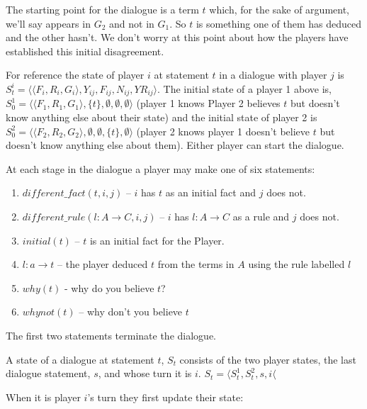 \documentclass{blue-book}
\newcommand{\drule}[3]{\ensuremath{#1:#2 \rightarrow #3}}
\begin{document}
The starting point for the dialogue is a term $t$ which, for the sake of argument, we'll say appears in $G_2$ and not in $G_1$.  So $t$ is something one of them has deduced and the other hasn't.  We don't worry at this point about how the players have established this initial disagreement.

For reference the state of player $i$ at statement $t$ in a dialogue with player $j$ is $S^i_t = \langle \langle F_i, R_i, G_i \rangle, Y_{ij}, F_{ij}, N_{ij}, YR_{ij} \rangle$.  The initial state of a player 1 above is, $S^1_0 = \langle \langle F_1, R_1, G_1 \rangle, \{t\}, \emptyset, \emptyset, \emptyset \rangle$ (player 1 knows Player 2 believes $t$ but doesn't know anything else about their state) and the initial state of player 2 is $S^2_0 = \langle \langle F_2, R_2, G_2 \rangle, \emptyset, \emptyset, \{t\}, \emptyset \rangle$ (player 2 knows player 1 doesn't believe $t$ but doesn't know anything else about them).  Either player can start the dialogue.


At each stage in the dialogue a player may make one of six statements:  
\begin{enumerate}
\item $\mathit{different\_fact(t, i, j)}$ -- $i$ has $t$ as an initial fact and $j$ does not.
\item $\mathit{different\_rule(\drule{l}{A}{C}, i, j)}$ -- $i$ has $\drule{l}{A}{C}$ as a rule and $j$ does not.
\item $initial(t)$ -- $t$ is an initial fact for the Player.
\item $\drule{l}{a}{t}$ -- the player deduced $t$ from the terms in $A$ using the rule labelled $l$
\item $why(t)$ - why do you believe $t$?
\item $whynot(t)$ -- why don't you believe $t$
\end{enumerate}
The first two statements terminate the dialogue.

A state of a dialogue at statement $t$, $S_t$ consists of the two player states, the last dialogue statement, $s$, and whose turn it is $i$.  $S_t = \langle S^1_t, S^2_t, s, i \langle$

When it is player $i$'s turn they first update their state:
\end{document}
